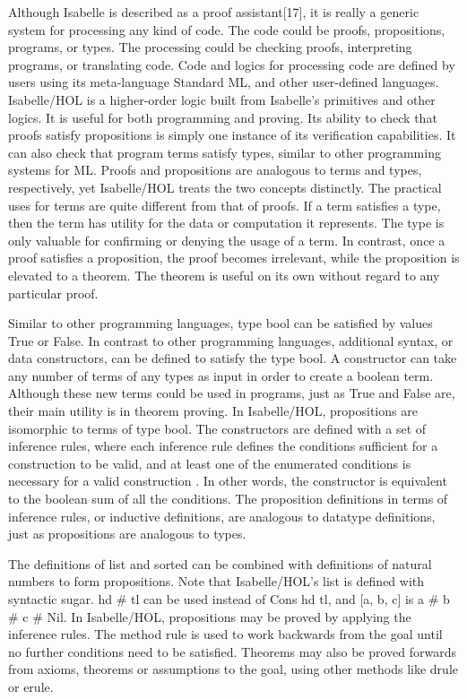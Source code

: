 \documentclass{article}
\begin{document}
Although Isabelle is described as a proof assistant[17], it is really a generic system for
processing any kind of code.  The code could be proofs, propositions, programs, or types.  The
processing could be checking proofs, interpreting programs, or translating code.  Code and
logics for processing code are defined by users using its meta-language Standard ML, and other
user-defined languages.  Isabelle/HOL is a higher-order logic built from Isabelle's primitives
and other logics.  It is useful for both programming and proving.  Its ability to check that
proofs satisfy propositions is simply one instance of its verification capabilities.  It can
also check that program terms satisfy types, similar to other programming systems for ML.
Proofs and propositions are analogous to terms and types, respectively, yet Isabelle/HOL treats
the two concepts distinctly.  The practical uses for terms are quite different from that of
proofs.  If a term satisfies a type, then the term has utility for the data or computation it
represents.  The type is only valuable for confirming or denying the usage of a term.  In
contrast, once a proof satisfies a proposition, the proof becomes irrelevant, while the
proposition is elevated to a theorem.  The theorem is useful on its own without regard to any
particular proof.

Similar to other programming languages, type bool can be satisfied by values True or False. In
contrast to other programming languages, additional syntax, or data constructors, can be
defined to satisfy the type bool.  A constructor can take any number of terms of any types as
input in order to create a boolean term. Although these new terms could be used in programs,
just as True and False are, their main utility is in theorem proving.  In Isabelle/HOL,
propositions are isomorphic to terms of type bool.  The constructors are defined with a set of
inference rules, where each inference rule defines the conditions sufficient for a
construction to be valid, and at least one of the enumerated conditions is necessary for a
valid construction .  In other words, the constructor is equivalent to the boolean sum of all
the conditions.  The proposition definitions in terms of inference rules, or inductive
definitions, are analogous to datatype definitions, just as propositions are analogous to
types.


The definitions of list and sorted can be combined with definitions of natural numbers to form
propositions.  Note that Isabelle/HOL's list is defined with syntactic sugar. hd \# tl can be
used instead of Cons hd tl, and [a, b, c] is a \# b \# c \# Nil.  In Isabelle/HOL, propositions
may be proved by applying the inference rules.  The method rule is used to work backwards from
the goal until no further conditions need to be satisfied.  Theorems may also be proved
forwards from axioms, theorems or assumptions to the goal, using other methods like drule or
erule.
\end{document}
